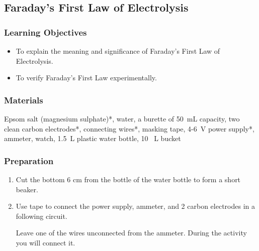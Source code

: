 \subsection{Faraday's First Law of Electrolysis}

\subsubsection*{Learning Objectives}
\begin{itemize}
\item{To explain the meaning and significance of Faraday's First Law of Electrolysis.}
\item{To verify Faraday's First Law experimentally.}
\end{itemize}

\subsubsection*{Materials}
Epsom salt (magnesium sulphate)*, water, a burette of 50~mL capacity, two clean carbon electrodes*, connecting wires*, masking tape, 4-6~V power supply*, ammeter, watch, 1.5~L plastic water bottle, 10~ L bucket

\subsubsection*{Preparation}
\begin{enumerate}
\item{Cut the bottom 6 cm from the bottle of the water bottle to form a short beaker.}
\item{Use tape to connect the power supply, ammeter, and 2 carbon electrodes in a following circuit. }

Leave one of the wires unconnected from the ammeter. During the activity you will connect it.
\end{enumerate}

